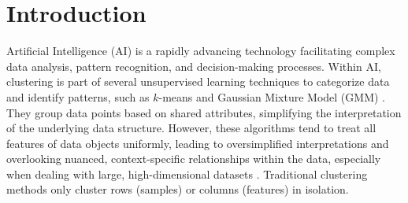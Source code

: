 

\section{Introduction}
Artificial Intelligence (AI) is a rapidly advancing technology facilitating complex data analysis, pattern recognition, and decision-making processes. Within AI, clustering is part of several unsupervised learning techniques to categorize data and identify patterns, such as $k$-means \cite{lloyd1982LeastSquaresQuantization, macqueen1967MethodsClassificationAnalysis} and Gaussian Mixture Model (GMM) \cite{dempster1977MaximumLikelihoodIncomplete}. They group data points based on shared attributes, simplifying the interpretation of the underlying data structure. However, these algorithms tend to treat all features of data objects uniformly, leading to oversimplified interpretations and overlooking nuanced, context-specific relationships within the data, especially when dealing with large, high-dimensional datasets \cite{chen2023FastFlexibleBipartite, zhao2023MultiviewCoclusteringMultisimilarity, kumar2023CoclusteringBasedMethods}. Traditional clustering methods \cite{zhang2023AdaptiveGraphConvolution, yuan2023JointNetworkTopology, wu2023EffectiveClusteringStructured} only cluster rows (samples) or columns (features) in isolation.

